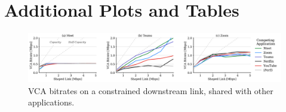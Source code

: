 
\newpage
\appendix

\section{Additional Plots and Tables}

\FloatBarrier

\setcounter{figure}{0}
\renewcommand\thefigure{A.\arabic{figure}}

\setcounter{table}{0}
\renewcommand\thetable{A.\arabic{table}}

\begin{figure}
    \centering
    \includegraphics[width=\linewidth]{figures/comp/dl_competition_all.pdf}
    \caption{VCA bitrates on a constrained downstream link, shared with other applications.}
    \label{fig:comp_ul}
\end{figure}
